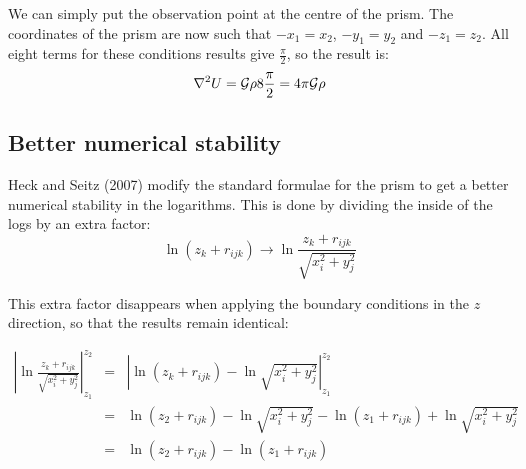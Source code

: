 We can simply put the observation point at the centre of the prism. The coordinates of the prism are now such that $-x_1 = x_2$, $-y_1 = y_2$ and $-z_1 = z_2$.
All eight terms for these conditions results give $\frac{\pi}{2}$, so the result is:
\begin{equation}
    \nabla^2U={\cal G} \rho8\frac{\pi}{2} = 4\pi {\cal G} \rho 
\end{equation}

\subsection{Better numerical stability}

Heck and Seitz (2007) \cite{hese07} modify the standard formulae for 
the prism to get a better numerical stability in the logarithms. 
This is done by dividing the inside of the logs by an extra factor:
\[
\ln{\left( z_k + r_{ijk} \right)} \to \ln{\frac{z_k + r_{ijk}}{\sqrt{x_i^2+y_j^2}}}
\]

This extra factor disappears when applying the boundary conditions in the $z$ direction, 
so that the results remain identical: 

\begin{eqnarray}
\left| 
\ln{\frac{z_k + r_{ijk}}{\sqrt{x_i^2+y_j^2}}} 
\right|^{z_2}_{z_1} 
&=& 
\left| 
\ln{\left(z_k + r_{ijk}\right)} - 
\ln{\sqrt{x_i^2+y_j^2}} 
\right|^{z_2}_{z_1} \nonumber\\
&=& 
\ln{\left(z_2 + r_{ijk}\right)} - 
\ln{\sqrt{x_i^2+y_j^2}} - 
\ln{\left(z_1 + r_{ijk}\right)} + 
\ln{\sqrt{x_i^2+y_j^2}} \nonumber\\
&=& 
\ln{\left(z_2 + r_{ijk}\right)} - 
\ln{\left(z_1 + r_{ijk}\right)}
\end{eqnarray}

